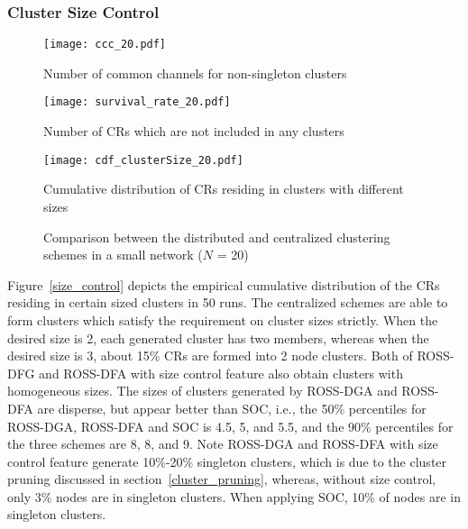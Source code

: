 \documentclass[10pt,journal,compsoc]{IEEEtran}
\theoremstyle{mytheoremstyle}
\theoremstyle{mytheoremstyle}
\theoremstyle{mytheoremstyle}
\newcommand{\ie}{i.e., }
\begin{document}
\subsubsection{Cluster Size Control}
\label{cluster_size}


\begin{figure*}[t]
\begin{multicols}{3}
    \texttt{[image: ccc\_20.pdf]}\par\caption{Number of common channels for non-singleton clusters}\label{ccc_per_nonsingleton}
    \texttt{[image: survival\_rate\_20.pdf]}\par\caption{Number of CRs which are not included in any clusters}\label{singleton_clusters}
    \texttt{[image: cdf\_clusterSize\_20.pdf]}\par\caption{Cumulative distribution of CRs residing in clusters with different sizes}\label{size_control}
\end{multicols}
\caption{Comparison between the distributed and centralized clustering schemes in a small network ($N$ = 20)}
\label{compare_dis_centralized}
\end{figure*}


Figure~\ref{size_control} depicts the empirical cumulative distribution of the CRs residing in certain sized clusters in 50 runs.
The centralized schemes are able to form clusters which satisfy the requirement on cluster sizes strictly.
When the desired size is 2, each generated cluster has two members, whereas when the desired size is 3, about 15\% CRs are formed into 2 node clusters.
Both of ROSS-DFG and ROSS-DFA with size control feature also obtain clusters with homogeneous sizes.
The sizes of clusters generated by ROSS-DGA and ROSS-DFA are disperse, but appear better than SOC, i.e., the 50\% percentiles for ROSS-DGA, ROSS-DFA and SOC is 4.5, 5, and 5.5, and the 90\% percentiles for the three schemes are 8, 8, and 9.
Note ROSS-DGA and ROSS-DFA with size control feature generate 10\%-20\% singleton clusters, which is due to the cluster pruning discussed in section~\ref{cluster_pruning}, whereas, without size control, only 3\% nodes are in singleton clusters.
When applying SOC, 10\% of nodes are in singleton clusters.
\end{document}
